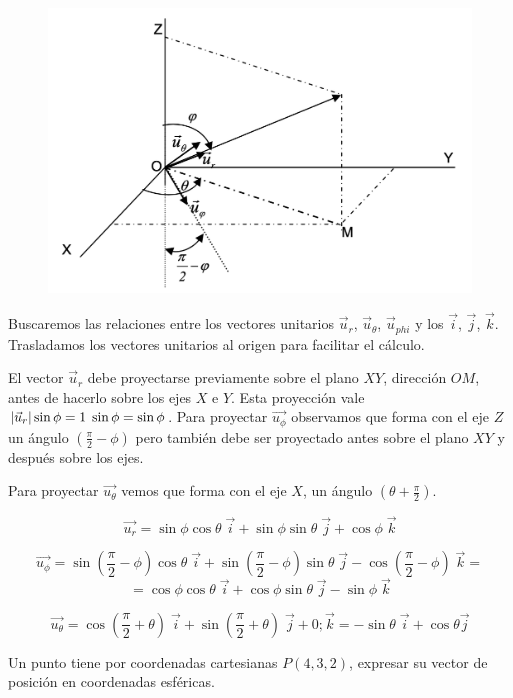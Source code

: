 \begin{figure}[H]
	\centering
	\includegraphics[width=.9\textwidth]{imagenes/apendices/APENDICESIM05b.png}
\end{figure}
Buscaremos las relaciones entre los vectores unitarios $\vec u_{r}$, $\vec u_{\theta}$, $\vec u_{phi}$ y los $\vec i$, $\vec j$, $\vec k$. Trasladamos los vectores unitarios al origen para facilitar el cálculo.

El vector $\vec u_{r}$ debe proyectarse previamente sobre el plano $XY$, dirección $OM$, antes de hacerlo sobre los ejes $X$ e $Y$. Esta proyección vale $\abs{\vec u_r} \sin \phi=1\; \sin \phi=\sin \phi$. Para proyectar $\vec {u_{\phi}}$  observamos que forma con el eje $Z$ un ángulo $(\frac \pi 2 - \phi)$ pero también debe ser proyectado antes sobre el plano $XY$ y después sobre los ejes.

Para proyectar $\vec {u_{\theta}}$ vemos que forma con el eje $X$, un ángulo $(\theta + \frac \pi 2)$.


$$\vec {u_r}=\sin \phi \cos \theta \;\vec i + \sin \phi \sin \theta \;\vec j + \cos \phi \; \vec k$$

$$\vec {u_{\phi}}=\sin (\frac \pi 2 -\phi) \cos \theta \; \vec i +\sin (\frac \pi 2 -\phi) \sin \theta \; \vec j - \cos (\frac \pi 2 - \phi)\; \vec k =$$ 
$$= \cos \phi \cos \theta \; \vec i + \cos \phi \sin \theta \; \vec j - \sin \phi \; \vec k$$

$$\vec {u_{\theta}}= \cos (\frac \pi 2 + \theta)\; \vec i + \sin (\frac \pi 2 + \theta)\; \vec j+0; \vec k = -\sin \theta \; \vec i + \cos \theta \vec j $$

\begin{ejem}
	Un punto tiene por coordenadas cartesianas $P(4,3,2)$, expresar su vector de posición en coordenadas esféricas.
\end{ejem}

